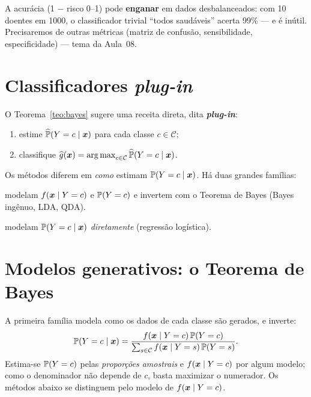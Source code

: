 \documentclass[11pt,a4paper]{article}
\begin{document}
\begin{atencao}
A acurácia (1 $-$ risco 0--1) pode \textbf{enganar} em dados desbalanceados: com 10
doentes em 1000, o classificador trivial ``todos saudáveis'' acerta 99\% --- e é
inútil. Precisaremos de outras métricas (matriz de confusão, sensibilidade,
especificidade) --- tema da Aula~08.
\end{atencao}

\section{Classificadores \emph{plug-in}}
O Teorema~\ref{teo:bayes} sugere uma receita direta, dita \textbf{\emph{plug-in}}:
\begin{enumerate}[leftmargin=1.6cm,nosep]
  \item estime $\widehat{\mathbb{P}}(Y=c\mid\bm{x})$ para cada classe $c\in\mathcal{C}$;
  \item classifique $\ghat(\x)=\argmax_{c\in\mathcal{C}}\widehat\Prob(Y=c\mid\x)$.
\end{enumerate}
Os métodos diferem em \emph{como} estimam $\mathbb{P}(Y=c\mid\bm{x})$. Há duas grandes
famílias:
\begin{description}[leftmargin=2.6cm,style=nextline]
  \item[Generativos] modelam $f(\bm{x}\mid Y=c)$ e $\mathbb{P}(Y=c)$ e invertem com o
        Teorema de Bayes (Bayes ingênuo, LDA, QDA).
  \item[Discriminativos] modelam $\mathbb{P}(Y=c\mid\bm{x})$ \emph{diretamente} (regressão
        logística).
\end{description}

\section{Modelos generativos: o Teorema de Bayes}
A primeira família modela como os dados de cada classe são gerados, e inverte:
\begin{equation}\label{eq:gen}
  \mathbb{P}(Y=c\mid\bm{x}) = \frac{f(\bm{x}\mid Y=c)\,\mathbb{P}(Y=c)}
                          {\sum_{s\in\mathcal{C}} f(\bm{x}\mid Y=s)\,\mathbb{P}(Y=s)}.
\end{equation}
Estima-se $\mathbb{P}(Y=c)$ pelas \emph{proporções amostrais} e $f(\bm{x}\mid Y=c)$ por
algum modelo; como o denominador não depende de $c$, basta maximizar o numerador.
Os métodos abaixo se distinguem pelo modelo de $f(\bm{x}\mid Y=c)$.
\end{document}
